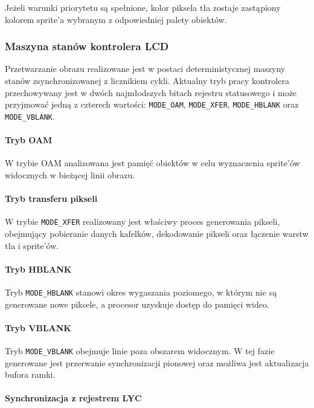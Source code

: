 \documentclass{article}
\begin{document}
Jeżeli warunki priorytetu są spełnione, kolor piksela tła zostaje zastąpiony kolorem sprite'a wybranym z odpowiedniej palety obiektów.

\subsubsection{Maszyna stanów kontrolera LCD}

Przetwarzanie obrazu realizowane jest w postaci deterministycznej maszyny stanów zsynchronizowanej z licznikiem cykli. Aktualny tryb pracy kontrolera przechowywany jest w dwóch najmłodszych bitach rejestru statusowego i może przyjmować jedną z czterech wartości: \texttt{MODE\_OAM}, \texttt{MODE\_XFER}, \texttt{MODE\_HBLANK} oraz \texttt{MODE\_VBLANK}.

\paragraph{Tryb OAM}

W trybie OAM analizowana jest pamięć obiektów w celu wyznaczenia sprite'ów widocznych w bieżącej linii obrazu.

\paragraph{Tryb transferu pikseli}

W trybie \texttt{MODE\_XFER} realizowany jest właściwy proces generowania pikseli, obejmujący pobieranie danych kafelków, dekodowanie pikseli oraz łączenie warstw tła i sprite'ów.

\paragraph{Tryb HBLANK}

Tryb \texttt{MODE\_HBLANK} stanowi okres wygaszania poziomego, w którym nie są generowane nowe piksele, a procesor uzyskuje dostęp do pamięci wideo.

\paragraph{Tryb VBLANK}

Tryb \texttt{MODE\_VBLANK} obejmuje linie poza obszarem widocznym. W tej fazie generowane jest przerwanie synchronizacji pionowej oraz możliwa jest aktualizacja bufora ramki.

\paragraph{Synchronizacja z rejestrem LYC}
\end{document}
